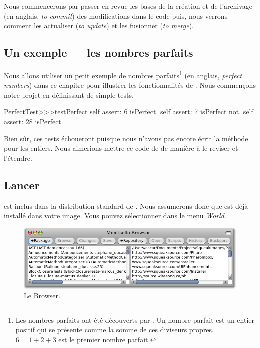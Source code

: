 \documentclass[a4paper,10pt,twoside]{book}
\begin{document}
Nous commencerons par passer en revue les bases de la création et
de l'archivage (en anglais, \emph{to commit}) des modifications dans
le code puis, nous verrons comment les actualiser (\emph{to
  update}) et les fusionner (\emph{to merge}).

\subsection{Un exemple --- les nombres parfaits} %

Nous allons utiliser un petit exemple de nombres
parfaits\footnote{Les nombres parfaits ont été découverts
  par . Un nombre parfait est un entier positif qui se
présente comme la somme de ces diviseurs propres. $6 = 1 + 2 + 3$ est
le premier nombre parfait.} (en anglais, \emph{perfect numbers}) dans
ce chapitre pour illustrer les fonctionnalités de \MC. Nous commençons
notre projet en définissant de simple tests.

\begin{code}{}
PerfectTest>>>testPerfect
	self assert: 6 isPerfect.
	self assert: 7 isPerfect not.
	self assert: 28 isPerfect.
\end{code}

Bien sûr, ces tests échoueront puisque nous n'avons pas encore écrit
la méthode  pour les entiers. Nous aimerions mettre ce
code  de \MC de manière à le reviser et
l'étendre.

\subsection{Lancer \MC}

\MC est inclus dans la distribution standard de \pharo.
Nous assumerons donc que \MC est déjà installé dans votre image.
Vous pouvez sélectionner 
 dans le menu \emph{World}.

\begin{figure}[ht]\centering
	\includegraphics[width=\textwidth]{monticelloBrowser}
	\caption{Le \MC Browser.}
\end{figure}
\end{document}
